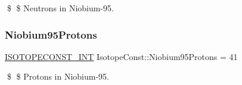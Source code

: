 \$ \$ Neutrons in Niobium-\/95. \mbox{\label{group___isotope_const-_niobium-_nb95_gacec879a71c2dc14598842b3df561af47}} 
\subsubsection{\texorpdfstring{Niobium95\+Protons}{Niobium95Protons}}
{\footnotesize\ttfamily \mbox{\hyperlink{group___isotope_const-_macros_ga5f18360b3e99483a35c32d789e62621c}{I\+S\+O\+T\+O\+P\+E\+C\+O\+N\+S\+T\+\_\+\+I\+NT}} Isotope\+Const\+::\+Niobium95\+Protons = 41}

\$ \$ Protons in Niobium-\/95. 
